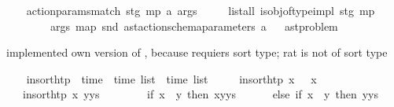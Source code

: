 \begin{isabellebody}
\ \ \isamarkupfalse%
\ {\isachardoublequoteopen}action{\isacharunderscore}{\kern0pt}params{\isacharunderscore}{\kern0pt}match{}\ stg\ mp\ a\ args\isanewline
\ \ \ \ {\isasymequiv}\ list{\isacharunderscore}{\kern0pt}all{}\ {\isacharparenleft}{\kern0pt}is{\isacharunderscore}{\kern0pt}obj{\isacharunderscore}{\kern0pt}of{\isacharunderscore}{\kern0pt}type{\isacharunderscore}{\kern0pt}impl\ stg\ mp{\isacharparenright}{\kern0pt}\isanewline
\ \ \ \ \ \ \ \ args\ {\isacharparenleft}{\kern0pt}map\ snd\ {\isacharparenleft}{\kern0pt}ast{\isacharunderscore}{\kern0pt}action{\isacharunderscore}{\kern0pt}schema{\isachardot}{\kern0pt}parameters\ a{\isacharparenright}{\kern0pt}{\isacharparenright}{\kern0pt}{\isachardoublequoteclose}\isanewline
\isanewline
{}\isamarkupfalse%
\ %
%
\isadelimdocument
%
\endisadelimdocument
%
\isatagdocument
%
\isamarkuptrue%
%
\endisatagdocument
{\isafolddocument}%
%
\isadelimdocument
%
\endisadelimdocument
{}\isamarkupfalse%
\ ast{\isacharunderscore}{\kern0pt}problem\ %
\begin{isamarkuptext}%
implemented own version of , because  
  requiers sort type; rat is not of sort type%
\end{isamarkuptext}\isamarkuptrue%
\ \ \isamarkupfalse%
\ insort{\isacharunderscore}{\kern0pt}htp\ {\isacharcolon}{\kern0pt}{\isacharcolon}{\kern0pt}\ {\isachardoublequoteopen}time\ {\isasymRightarrow}\ time\ list\ {\isasymRightarrow}\ time\ list{\isachardoublequoteclose}\ \isanewline
\ \ \ \ {\isachardoublequoteopen}insort{\isacharunderscore}{\kern0pt}htp\ x\ {\isacharbrackleft}{\kern0pt}{\isacharbrackright}{\kern0pt}\ {\isacharequal}{\kern0pt}\ {\isacharbrackleft}{\kern0pt}x{\isacharbrackright}{\kern0pt}{\isachardoublequoteclose}\isanewline
\ \ {\isacharbar}{\kern0pt}\ {\isachardoublequoteopen}insort{\isacharunderscore}{\kern0pt}htp\ x\ {\isacharparenleft}{\kern0pt}y{\isacharhash}{\kern0pt}ys{\isacharparenright}{\kern0pt}\ {\isacharequal}{\kern0pt}\ \isanewline
\ \ \ \ \ \ {\isacharparenleft}{\kern0pt}if\ x\ {\isacharless}{\kern0pt}\ y\ then\ x{\isacharhash}{\kern0pt}y{\isacharhash}{\kern0pt}ys\isanewline
\ \ \ \ \ \ else\ if\ x\ {\isacharequal}{\kern0pt}\ y\ then\ y{\isacharhash}{\kern0pt}ys\isanewline

\end{isabellebody}
